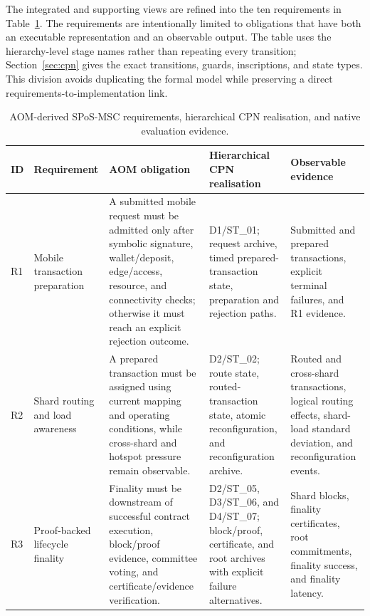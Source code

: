 \documentclass[a4paper,fleqn]{cas-sc}
\begin{document}
The integrated and supporting views are refined into the ten requirements in Table~\ref{tab:reqs}. The requirements are intentionally limited to obligations that have both an executable representation and an observable output. The table
uses the hierarchy-level stage names rather than repeating every transition; Section~\ref{sec:cpn} gives the exact transitions, guards, inscriptions, and state types. This division avoids duplicating the formal model while preserving a direct requirements-to-implementation link. 

\begin{table}[pos=t]
\centering
\caption{AOM-derived SPoS-MSC requirements, hierarchical CPN realisation, and
native evaluation evidence.}
\label{tab:reqs}
\scriptsize
\setlength{\tabcolsep}{3.2pt}
\renewcommand{\arraystretch}{1.10}
\begin{tabularx}{\textwidth}{p{0.65cm}p{2.5cm}p{3.5cm}p{4.4cm}X}
\toprule
\textbf{ID} & \textbf{Requirement} & \textbf{AOM obligation} &
\textbf{Hierarchical CPN realisation} & \textbf{Observable evidence}\\
\midrule
R1 & Mobile transaction preparation &
A submitted mobile request must be admitted only after symbolic signature,
wallet/deposit, edge/access, resource, and connectivity checks; otherwise it
must reach an explicit rejection outcome. &
D1/ST\_01; request archive, timed prepared-transaction state, preparation and
rejection paths. &
Submitted and prepared transactions, explicit terminal failures, and R1
evidence.\\

R2 & Shard routing and load awareness &
A prepared transaction must be assigned using current mapping and operating
conditions, while cross-shard and hotspot pressure remain observable. &
D2/ST\_02; route state, routed-transaction state, atomic reconfiguration, and
reconfiguration archive. &
Routed and cross-shard transactions, logical routing effects, shard-load
standard deviation, and reconfiguration events.\\

R3 & Proof-backed lifecycle finality &
Finality must be downstream of successful contract execution, block/proof
evidence, committee voting, and certificate/evidence verification. &
D2/ST\_05, D3/ST\_06, and D4/ST\_07; block/proof, certificate, and root archives
with explicit failure alternatives. &
Shard blocks, finality certificates, root commitments, finality success, and
finality latency.\\


\end{tabularx}
\end{table}
\end{document}
